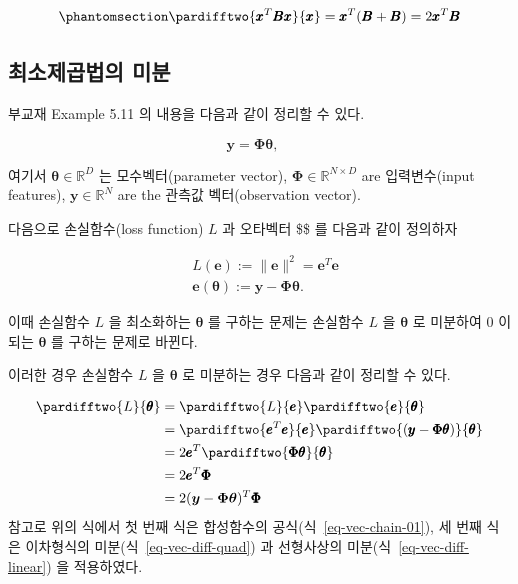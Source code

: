 \documentclass[
  11pt,
  a4paper,
  oneside]{scrbook}
\theoremstyle{definition}
\theoremstyle{definition}
\theoremstyle{plain}
\theoremstyle{remark}
\begin{document}
\begin{equation}\phantomsection\label{eq-vec-diff-quad}{
\pardifftwo{\pmb x^T \pmb B \pmb x}{\pmb x} = \pmb x^T (\pmb B + \pmb B) = 2 \pmb x^T \pmb B
}\end{equation}

\subsection{최소제곱법의
미분}\label{uxcd5cuxc18cuxc81cuxacf1uxbc95uxc758-uxbbf8uxbd84}

부교재 Example 5.11 의 내용을 다음과 같이 정리할 수 있다.

\[ \pmb y = \pmb \Phi \pmb \theta, \quad\]

여기서 \(\boldsymbol{\theta} \in \mathbb{R}^D\) 는 모수벡터(parameter
vector), \(\boldsymbol{\Phi} \in \mathbb{R}^{N \times D}\) are
입력변수(input features), \(\boldsymbol{y} \in \mathbb{R}^N\) are the
관측값 벡터(observation vector).

다음으로 손실함수(loss function) \(L\) 과 오타벡터 \$\pmb \$ 를 다음과
같이 정의하자

\[
\begin{aligned}
& L(\boldsymbol{e}):=\|\boldsymbol{e}\|^2 = \pmb e^T \pmb e\\
& \boldsymbol{e}(\boldsymbol{\theta}):=\boldsymbol{y}-\boldsymbol{\Phi} \boldsymbol{\theta} .
\end{aligned}
\]

이때 손실함수 \(L\) 을 최소화하는 \(\boldsymbol{\theta}\) 를 구하는
문제는 손실함수 \(L\) 을 \(\boldsymbol{\theta}\) 로 미분하여 0 이 되는
\(\boldsymbol{\theta}\) 를 구하는 문제로 바뀐다.

이러한 경우 손실함수 \(L\) 을 \(\boldsymbol{\theta}\) 로 미분하는 경우
다음과 같이 정리할 수 있다.

\[
\begin{aligned}
\pardifftwo{L}{\pmb \theta} & =   \pardifftwo{L}{\pmb e} \pardifftwo{\pmb e}{\pmb \theta} \\
& =  \pardifftwo{\pmb e^T \pmb e}{\pmb e} \pardifftwo{(\pmb y - \pmb \Phi \pmb \theta)}{\pmb \theta} \\
& = 2\pmb e^T \pardifftwo {\pmb \Phi \pmb \theta}{\pmb \theta} \\
& = 2\pmb e^T \pmb \Phi \\
& = 2(\boldsymbol{y}-\boldsymbol{\Phi} \boldsymbol{\theta} ) ^T \pmb \Phi \\
\end{aligned}
\] 참고로 위의 식에서 첫 번째 식은 합성함수의
공식(식~\ref{eq-vec-chain-01}), 세 번째 식은 이차형식의
미분(식~\ref{eq-vec-diff-quad}) 과 선형사상의
미분(식~\ref{eq-vec-diff-linear}) 을 적용하였다.
\end{document}
